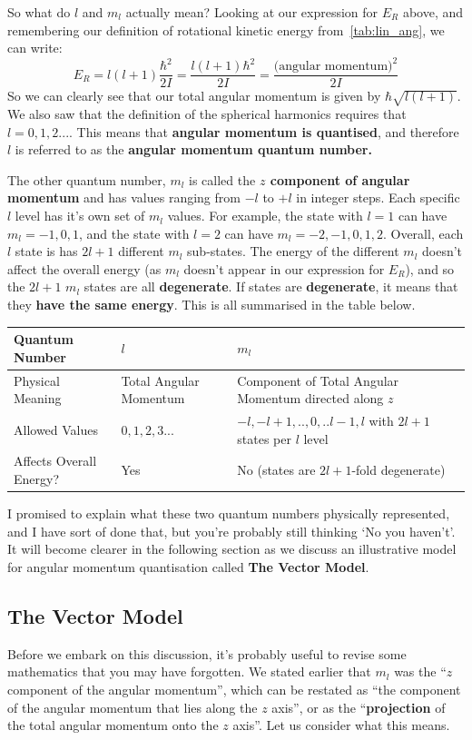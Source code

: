 \documentclass{memoir}[11pt,oneside,a4paper,openany]
\begin{document}
So what do $l$ and $m_l$ actually mean? Looking at our expression for $E_R$ above, and remembering our definition of rotational kinetic energy from~\autoref{tab:lin_ang}, we can write:
\begin{equation}
	E_R = l(l+1)\frac{\hbar^2}{2I} = \frac{l(l+1)\hbar^2}{2I} = \frac{\text{(angular momentum)}^2}{2I}
\end{equation}
So we can clearly see that our total angular momentum is given by $\hbar\sqrt{l(l+1)}$. We also saw that the definition of the spherical harmonics requires that $l=0,1,2...$. This means that \textbf{angular momentum is quantised}, and therefore $l$ is referred to as the \textbf{angular momentum quantum number.}  

The other quantum number, $m_l$ is called the \textbf{$z$ component of angular momentum} and has values ranging from $-l$ to $+l$ in integer steps. Each specific $l$ level has it's own set of $m_l$ values. For example, the state with $l=1$ can have $m_l = -1,0,1$, and the state with $l=2$ can have $m_l = -2,-1,0,1,2$. Overall, each $l$ state is has $2l+1$ different $m_l$ sub-states. The energy of the different $m_l$ doesn't affect the overall energy (as $m_l$ doesn't appear in our expression for $E_R$), and so the $2l+1$ $m_l$ states are all \textbf{degenerate}. If states are \textbf{degenerate}, it means that they \textbf{have the same energy}. This is all summarised in the table below.
\begin{table}[h]
\begin{tabular}{@{}lll@{}}
\toprule
Quantum Number & $l$ & $m_l$ \\ \midrule
Physical Meaning & Total Angular Momentum & Component of Total Angular Momentum directed along $z$  \\
Allowed Values & $0,1,2,3...$ &  $-l,-l+1,..,0,..l-1,l$ with $2l+1$ states per $l$ level  \\
Affects Overall Energy? & Yes & No (states are $2l+1$-fold degenerate) \\ \bottomrule
\end{tabular}
\end{table}

I promised to explain what these two quantum numbers physically represented, and I have sort of done that, but you're probably still thinking `No you haven't'. It will become clearer in the following section as we discuss an illustrative model for angular momentum quantisation called \textbf{The Vector Model}.

\subsection{The Vector Model}
Before we embark on this discussion, it's probably useful to revise some mathematics that you may have forgotten. We stated earlier that $m_l$ was the ``$z$ component of the angular momentum'', which can be restated as ``the component of the angular momentum that lies along the $z$ axis'', or as the ``\textbf{projection} of the total angular momentum onto the $z$ axis''. Let us consider what this means.
\end{document}
